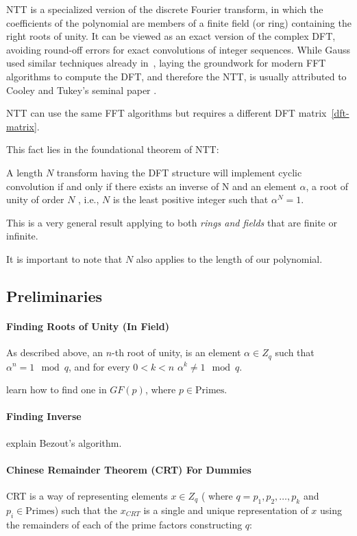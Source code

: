 NTT is a specialized version of the discrete Fourier transform,
in which the coefficients of the polynomial are members of a finite field (or ring)
 containing the right roots of unity.
It can be viewed as an exact version of the complex DFT, avoiding 
round-off errors for exact convolutions of integer sequences.
While Gauss used similar techniques already in~\cite{gaussfft}, laying the groundwork 
for modern FFT algorithms to compute the DFT, and therefore the NTT, 
is usually attributed to Cooley and Tukey's seminal paper \cite{fft}.

NTT can use the same FFT algorithms but requires a 
different DFT matrix~\ref{dft-matrix}.

This fact lies in the foundational theorem of NTT:
\begin{thm}
  A length $N$ transform having the DFT structure will
  implement cyclic convolution if and only if there exists an 
  inverse of N and an element $\alpha$,
  a root of unity of order $N$ , i.e., $N$ is the least 
  positive integer such that $\alpha^N =1$.
\end{thm}
This is a very general result applying to both \emph{rings and fields} that are
finite or infinite.

It is important to note that $N$ also applies to the length of our polynomial.

\subsection{Preliminaries}

\paragraph{\bf Finding Roots of Unity (In Field)}
As described above, an $n$-th root of unity, is an element $\alpha\in Z_q$ 
such that $\alpha^n =1  \mod q $, and for every $0<k<n$ $\alpha^k \neq 1 \mod q$.

 learn how to find one in $GF(p)$, where $p\in \text{Primes}$.



\paragraph{\bf Finding Inverse}
 explain Bezout's algorithm.


\paragraph{\bf Chinese Remainder Theorem (CRT) For Dummies}
CRT is a way of representing elements $x\in Z_q$ (
  where $q=p_1,p_2,\dots,p_k$ and $p_i\in\text{Primes}$)
such that the $x_{CRT}$ is a single and unique representation of $x$ using the 
remainders of each of the prime factors constructing $q$:

